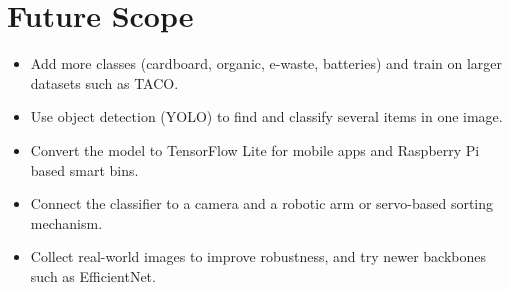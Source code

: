 \section{Future Scope}
\begin{itemize}
  \item Add more classes (cardboard, organic, e-waste, batteries) and train on larger datasets such as TACO.
  \item Use object detection (YOLO) to find and classify several items in one image.
  \item Convert the model to TensorFlow Lite for mobile apps and Raspberry Pi based smart bins.
  \item Connect the classifier to a camera and a robotic arm or servo-based sorting mechanism.
  \item Collect real-world images to improve robustness, and try newer backbones such as EfficientNet.
\end{itemize}
